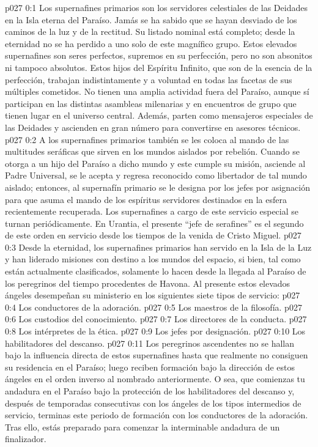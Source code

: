 \author{Perfeccionador de la sabiduría}
\vs p027 0:1 Los supernafines primarios son los servidores celestiales de las Deidades en la Isla eterna del Paraíso. Jamás se ha sabido que se hayan desviado de los caminos de la luz y de la rectitud. Su listado nominal está completo; desde la eternidad no se ha perdido a uno solo de este magnífico grupo. Estos elevados supernafines son seres perfectos, supremos en su perfección, pero no son absonitos ni tampoco absolutos. Estos hijos del Espíritu Infinito, que son de la esencia de la perfección, trabajan indistintamente y a voluntad en todas las facetas de sus múltiples cometidos. No tienen una amplia actividad fuera del Paraíso, aunque sí participan en las distintas asambleas milenarias y en encuentros de grupo que tienen lugar en el universo central. Además, parten como mensajeros especiales de las Deidades y ascienden en gran número para convertirse en asesores técnicos.
\vs p027 0:2 A los supernafines primarios también se les coloca al mando de las multitudes seráficas que sirven en los mundos aislados por rebelión. Cuando se otorga a un hijo del Paraíso a dicho mundo y este cumple su misión, asciende al Padre Universal, se le acepta y regresa reconocido como libertador de tal mundo aislado; entonces, al supernafín primario se le designa por los jefes por asignación para que asuma el mando de los espíritus servidores destinados en la esfera recientemente recuperada. Los supernafines a cargo de este servicio especial se turnan periódicamente. En Urantia, el presente “jefe de serafines” es el segundo de este orden en servicio desde los tiempos de la venida de Cristo Miguel.
\vs p027 0:3 Desde la eternidad, los supernafines primarios han servido en la Isla de la Luz y han liderado misiones con destino a los mundos del espacio, si bien, tal como están actualmente clasificados, solamente lo hacen desde la llegada al Paraíso de los peregrinos del tiempo procedentes de Havona. Al presente estos elevados ángeles desempeñan su ministerio en los siguientes siete tipos de servicio:
\vs p027 0:4 Los conductores de la adoración.
\vs p027 0:5 Los maestros de la filosofía.
\vs p027 0:6 Los custodios del conocimiento.
\vs p027 0:7 Los directores de la conducta.
\vs p027 0:8 Los intérpretes de la ética.
\vs p027 0:9 Los jefes por designación.
\vs p027 0:10 Los habilitadores del descanso.
\vs p027 0:11 Los peregrinos ascendentes no se hallan bajo la influencia directa de estos supernafines hasta que realmente no consiguen su residencia en el Paraíso; luego reciben formación bajo la dirección de estos ángeles en el orden inverso al nombrado anteriormente. O sea, que comienzas tu andadura en el Paraíso bajo la protección de los habilitadores del descanso y, después de temporadas consecutivas con los ángeles de los tipos intermedios de servicio, terminas este periodo de formación con los conductores de la adoración. Tras ello, estás preparado para comenzar la interminable andadura de un finalizador.
